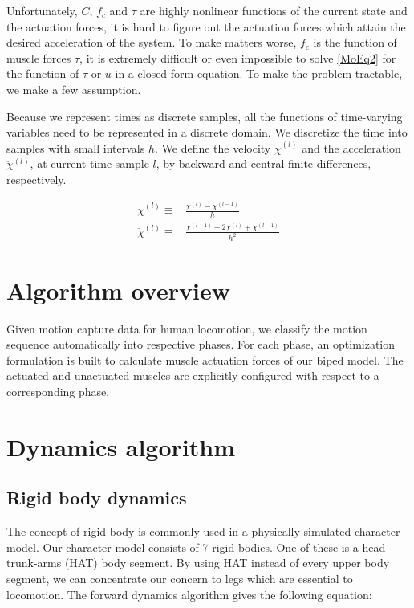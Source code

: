 \documentclass[a4paper,10pt]{article}
\begin{document}
Unfortunately, $C$, $f_c$ and $\tau$ are highly nonlinear functions of the current state and the
actuation forces, it is hard to figure out the actuation forces which attain
the desired acceleration of the system. To make matters worse, $f_c$ is the function
of muscle forces $\tau$, it is extremely difficult or even impossible
to solve \eqref{MoEq2} for the function of $\tau$ or $u$ in a closed-form
equation.
To make the problem tractable, we make a few assumption. 

Because we represent times as discrete samples, all the functions of
time-varying variables need to be represented in a discrete domain.
We discretize the time into samples with small intervals $h$. We define
the velocity $\dot\chi^{(l)}$ and the acceleration $\ddot\chi^{(l)}$, at current
time sample $l$, by backward and central finite differences, respectively.

\begin{align}
\dot\chi^{(l)}  \equiv {} & \frac{\chi^{(l)}-\chi^{(l-1)}}{h}\label{vel-dis}\\
\ddot\chi^{(l)} \equiv {} & \frac{\chi^{(l+1)}-2\chi^{(l)}+\chi^{(l-1)}}{h^2}\label{acc-dis}
\end{align}


\pagebreak

\section{Algorithm overview}

Given motion capture data for human locomotion, we classify the motion
sequence automatically into respective phases. For each phase,
an optimization formulation is built to calculate muscle actuation forces
of our biped model. The actuated and unactuated muscles are explicitly configured
with respect to a corresponding phase.


\pagebreak

\section{Dynamics algorithm}

\subsection{Rigid body dynamics}

The concept of rigid body is commonly used in a physically-simulated
character model.
Our character model consists of 7 rigid bodies. One of these is
a head-trunk-arms (HAT) body segment. By using HAT instead of every upper body
segment, we can concentrate our concern to legs which are essential to
locomotion. The forward dynamics algorithm gives the following equation:
\end{document}
